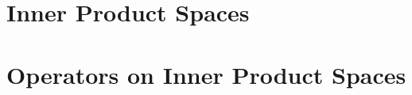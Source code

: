 \documentclass[11pt]{report}
\begin{document}
  \chapter{Inner Product Spaces}
  
  
  

  \chapter{Operators on Inner Product Spaces}
  
  
  
  
  
  
\end{document}
